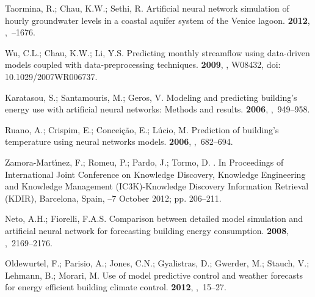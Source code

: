 \documentclass[energies,article,accept,moreauthors,pdftex,12pt,a4paper]{mdpi}
\begin{document}
\begin{thebibliography}{----}
Taormina, R.; Chau, K.W.; Sethi, R.
\newblock Artificial neural network simulation of hourly groundwater levels in
 a coastal aquifer system of the Venice lagoon.
 {\bf 2012},
,~--1676.

Wu, C.L.; Chau, K.W.; Li, Y.S.
\newblock Predicting monthly streamflow using data-driven models coupled with
 data-preprocessing techniques.
 {\bf 2009},
, W08432, doi: 10.1029/2007WR006737.

Karatasou, S.; Santamouris, M.; Geros, V.
\newblock Modeling and predicting building's energy use with artificial neural
 networks: Methods and results.
 {\bf 2006},
,~949--958.

Ruano, A.; Crispim, E.; Concei{\c c}{\~a}o, E.; L{\'u}cio, M.
\newblock Prediction of building's temperature using neural networks models.
 {\bf 2006},
,~682--694.

Zamora-Mart{\'\i}nez, F.; Romeu, P.; Pardo, J.; Tormo, D.
. In Proceedings of International Joint Conference on Knowledge Discovery, Knowledge Engineering and Knowledge Management (IC3K)-Knowledge Discovery Information Retrieval (KDIR),
\newblock Barcelona, Spain, 
--7 October 2012; pp. 206--211.

Neto, A.H.; Fiorelli, F.A.S.
\newblock Comparison between detailed model simulation and artificial neural
 network for forecasting building energy consumption.
 {\bf 2008},
,~2169--2176.

Oldewurtel, F.; Parisio, A.; Jones, C.N.; Gyalistras, D.; Gwerder, M.; Stauch,
 V.; Lehmann, B.; Morari, M.
\newblock Use of model predictive control and weather forecasts for energy
 efficient building climate control.
 {\bf 2012},
,~15--27.


\end{thebibliography}
\end{document}
